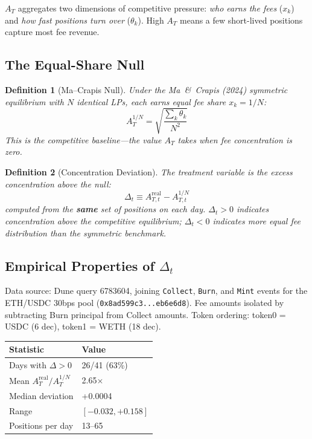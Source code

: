 \documentclass[11pt,a4paper]{article}
\newtheorem{definition}{Definition}
\begin{document}
$A_T$ aggregates two dimensions of competitive pressure: \emph{who earns
the fees} ($x_k$) and \emph{how fast positions turn over} ($\theta_k$).
High $A_T$ means a few short-lived positions capture most fee revenue.

\subsection{The Equal-Share Null}

\begin{definition}[Ma--Crapis Null]\label{def:null}
Under the Ma~\&~Crapis (2024) symmetric equilibrium with $N$ identical LPs,
each earns equal fee share $x_k = 1/N$:
\begin{equation}\label{eq:null}
  A_T^{1/N} = \sqrt{\frac{\sum_k \theta_k}{N^2}}
\end{equation}
This is the competitive baseline---the value $A_T$ takes when fee
concentration is zero.
\end{definition}

\begin{definition}[Concentration Deviation]\label{def:deviation}
The treatment variable is the excess concentration above the null:
\begin{equation}\label{eq:deviation}
  \Delta_t \equiv A_{T,t}^{\text{real}} - A_{T,t}^{1/N}
\end{equation}
computed from the \textbf{same} set of positions on each day. $\Delta_t > 0$
indicates concentration above the competitive equilibrium; $\Delta_t < 0$
indicates more equal fee distribution than the symmetric benchmark.
\end{definition}

\subsection{Empirical Properties of $\Delta_t$}

Data source: Dune query 6783604, joining \texttt{Collect}, \texttt{Burn},
and \texttt{Mint} events for the ETH/USDC 30bps pool
(\texttt{0x8ad599c3...eb6e6d8}). Fee amounts isolated by subtracting Burn
principal from Collect amounts. Token ordering: token0 = USDC (6 dec),
token1 = WETH (18 dec).

\begin{center}
\begin{tabular}{ll}
\toprule
Statistic & Value \\
\midrule
Days with $\Delta > 0$ & 26/41 (63\%) \\
Mean $A_T^{\text{real}} / A_T^{1/N}$ & 2.65$\times$ \\
Median deviation & +0.0004 \\
Range & $[-0.032, +0.158]$ \\
Positions per day & 13--65 \\
\bottomrule
\end{tabular}
\end{center}
\end{document}
